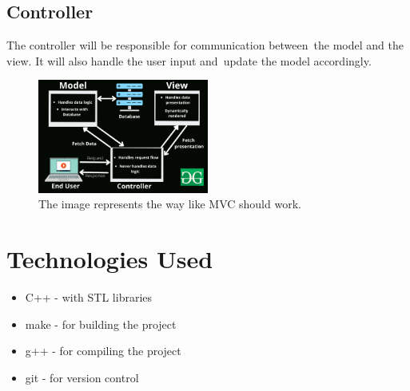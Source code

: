 \documentclass[a4paper,12pt]{article}
\begin{document}
\subsection{Controller}
The controller will be responsible for communication between\
the model and the view. It will also handle the user input and\
update the model accordingly.\newline \newline

\begin{figure}[h]
    \centering
    \includegraphics[width=0.5\textwidth]{images/Model1.png}
    \caption{The image represents the way like MVC should work.}
    \label{fig:class_diagram}
\end{figure}



\section{Technologies Used}
\begin{itemize}
    \item C++ - with STL libraries
    \item make - for building the project
    \item g++ - for compiling the project
    \item git - for version control
\end{itemize}
\end{document}
